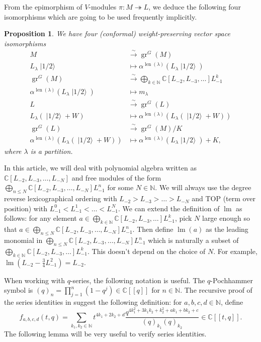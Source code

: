 \documentclass[a4paper, 12pt, reqno]{amsart}
\newtheorem{proposition}[theorem]{Proposition}
\theoremstyle{remark}
\DeclareMathOperator{\gr}{gr}
\DeclareMathOperator{\lm}{lm}
\DeclareMathOperator{\len}{len}
\DeclareMathOperator{\vachalf}{|1/2\rangle}
\begin{document}
From the epimorphism of $V$-modules $\pi: M \twoheadrightarrow L$, we deduce the following four isomorphisms which are going to be used frequently implicitly.

\begin{proposition}
  \label{prp:7}
  We have four (conformal) weight-preserving vector space isomorphisms
  \begin{align*}
    M &\xrightarrow{\sim} \gr^G(M) \\
    L_\lambda\vachalf &\mapsto \alpha^{\len(\lambda)}(L_\lambda\vachalf) \\
    \gr^G(M) &\xrightarrow{\sim} \bigoplus_{k \in \mathbb{N}}\mathbb{C}[L_{-2}, L_{-3}, \dots]L_{-1}^k \\
    \alpha^{\len(\lambda)}(L_\lambda\vachalf) &\mapsto m_\lambda \\
    L &\xrightarrow{\sim} \gr^G(L) \\
    L_\lambda(\vachalf + W) &\mapsto \alpha^{\len(\lambda)}(L_\lambda(\vachalf + W)) \\
    \gr^G(L) &\xrightarrow{\sim} \gr^G(M)/K \\
    \alpha^{\len(\lambda)}(L_\lambda(\vachalf + W)) &\mapsto \alpha^{\len(\lambda)}(L_\lambda\vachalf) + K,
  \end{align*}
  where $\lambda$ is a partition.
\end{proposition}

In this article, we will deal with polynomial algebra written as $\mathbb{C}[L_{-2}, L_{-3}, \dots, L_{-N}]$ and free modules of the form $\bigoplus_{n \le N}\mathbb{C}[L_{-2}, L_{-3}, \dots, L_{-N}]L_{-1}^n$ for some $N \in \mathbb{N}$.
We will always use the degree reverse lexicographical ordering with $L_{-2} > L_{-3} > \dots > L_{-N}$ and TOP (term over position) with $L_{-1}^0 < L_{-1}^1 < \dots < L_{-1}^N$.
We can extend the definition of $\lm$ as follows: for any element $a \in \bigoplus_{k \in \mathbb{N}}\mathbb{C}[L_{-2}, L_{-3}, \dots]L_{-1}^k$, pick $N$ large enough so that $a \in \bigoplus_{n \le N}\mathbb{C}[L_{-2}, L_{-3}, \dots, L_{-N}]L_{-1}^n$.
Then define $\lm(a)$ as the leading monomial in $\bigoplus_{n \le N}\mathbb{C}[L_{-2}, L_{-3}, \dots, L_{-N}]L_{-1}^n$ which is naturally a subset of $\bigoplus_{k \in \mathbb{N}}\mathbb{C}[L_{-2}, L_{-3}, \dots]L_{-1}^k$.
This doesn't depend on the choice of $N$.
For example, $\lm(L_{-2} - \frac{3}{4}L_{-1}^2) = L_{-2}$.

When working with $q$-series, the following notation is useful.
The $q$-Pochhammer symbol is $(q)_n = \prod_{j = 1}^n(1 - q^j) \in \mathbb{C}[[q]]$ for $n \in \mathbb{N}$.
The recursive proof of the series identities in \cite{andrews_singular_2022} suggest the following definition: for $a, b, c, d \in \mathbb{N}$, define
\begin{equation*}
  f_{a, b, c, d}(t, q) = \sum_{k_1, k_2 \in \mathbb{N}}t^{4k_1 + 2k_2 + d}\frac{q^{4k_1^2 + 3k_1k_2 + k_2^2 + ak_1 + bk_2 + c}}{(q)_{k_1}(q)_{k_2}} \in \mathbb{C}[[t, q]].
\end{equation*}
The following lemma will be very useful to verify series identities.
\end{document}
